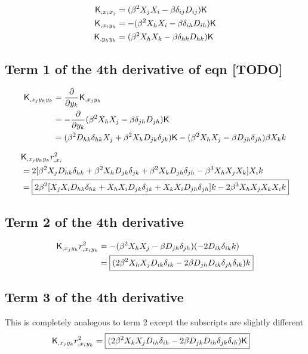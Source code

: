 \begin{align}
\mathsf{K}_{,x_i x_j} &= (\beta^2 X_j X_i - \beta \delta_{ij} D_{ij})\mathsf{K}\\ 
\mathsf{K}_{,x_i y_h} &= -(\beta^2 X_h X_i - \beta \delta_{ih} D_{ih})\mathsf{K}\\ 
\mathsf{K}_{,y_h y_k} &= (\beta^2 X_h X_k - \beta \delta_{hk} D_{hk})\mathsf{K} 
\end{align}

\subsection{Term 1 of the 4th derivative of eqn [TODO]}
\begin{align*}
\mathsf{K}_{,x_j y_h y_k}
&= \frac{\partial}{\partial y_k} \mathsf{K}_{,x_j y_h}\\ 
&= -\frac{\partial}{\partial y_k} (\beta^2 X_h X_j - \beta \delta_{jh} D_{jh})\mathsf{K}\\
&= (\beta^2 D_{hk} \delta_{hk} X_j + \beta^2 X_h D_{jk}\delta_{jk})\mathsf{K} -
(\beta^2 X_h X_j - \beta D_{jh} \delta_{jh})\beta X_k k
\end{align*}

\begin{align*}
&\mathsf{K}_{,x_j y_h y_k} r_{,x_i}^2\\
&= 2[\beta^2 X_j D_{hk} \delta_{hk} + \beta^2 X_h D_{jk}\delta_{jk} +
\beta^2 X_k D_{jh} \delta_{jh} - \beta^3 X_h X_j X_k] X_i k\\ 
&=\boxed{2\beta^2[ 
X_j X_i D_{hk} \delta_{hk} + 
X_h X_i D_{jk} \delta_{jk} + 
X_k X_i D_{jh} \delta_{jh}] k  
- 2\beta^3 X_h X_j X_k X_i k} 
\end{align*}

\subsection{Term 2 of the 4th derivative}
\begin{align*}
\mathsf{K}_{,x_j y_h} r^2_{,x_i y_k}
&= - (\beta^2 X_h X_j - \beta D_{jh} \delta_{jh}) (-2D_{ik} \delta_{ik}k) \\  
&= \boxed{( 2 \beta^2  X_h X_j D_{ik} \delta_{ik} 
-2 \beta D_{jh} D_{ik} \delta_{jh} \delta_{ik}) k} 
\end{align*}

\subsection{Term 3 of the 4th derivative}
This is completely analogous to term 2 except the subscripts are slightly
different
\begin{align*}
\mathsf{K}_{,x_j y_k} r^2_{,x_i y_h}
&=\boxed { ( 2 \beta^2  X_k X_j D_{ih} \delta_{ih} 
-2 \beta D_{jk} D_{ih} \delta_{jk} \delta_{ih}) \mathsf{K}} 
\end{align*}

